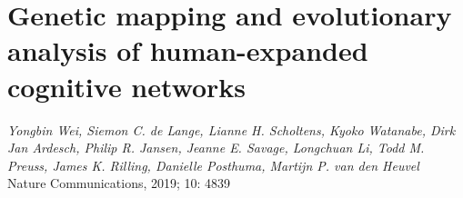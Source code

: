 \pagestyle{MyStyle}

\chapter{Genetic mapping and evolutionary analysis of human-expanded cognitive networks}


\label{ch:HAR}

\begin{flushright}
\textit{Yongbin Wei, Siemon C. de Lange, Lianne H. Scholtens, Kyoko Watanabe, Dirk Jan Ardesch, Philip R. Jansen, Jeanne E. Savage, Longchuan Li, Todd M. Preuss, James K. Rilling, Danielle Posthuma, Martijn P. van den Heuvel}\\
Nature Communications, 2019; 10: 4839
\vspace{7 mm}

\end{flushright}

